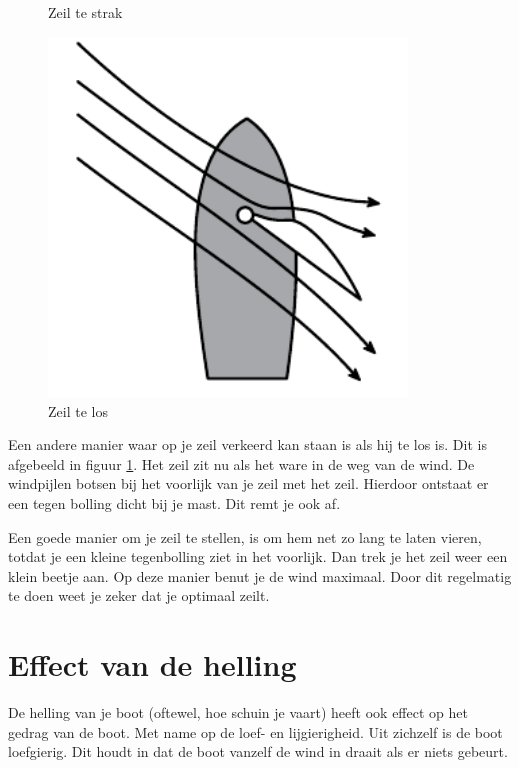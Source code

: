 \begin{figure}[H]
\begin{minipage}[b]{0.32\textwidth}
    \caption{Zeil te strak}
    \label{pic:zeil_strak}
    \end{minipage}
  \hfill
  \begin{minipage}[b]{0.32\textwidth}
    \centering
    \includegraphics[width=0.85\textwidth]{Hoofdstukken/Krachten/pdf/zeil_los.pdf}
    \caption{Zeil te los}
    \label{pic:zeil_los}
  \end{minipage}
\end{figure}
Een andere manier waar op je zeil verkeerd kan staan is als hij te los is. Dit is afgebeeld in figuur \ref{pic:zeil_los}. Het zeil zit nu als het ware in de weg van de wind. De windpijlen botsen bij het voorlijk van je zeil met het zeil. Hierdoor ontstaat er een tegen bolling dicht bij je mast. Dit remt je ook af. 

Een goede manier om je zeil te stellen, is om hem net zo lang te laten vieren, totdat je een kleine tegenbolling ziet in het voorlijk. Dan trek je het zeil weer een klein beetje aan. Op deze manier benut je de wind maximaal. Door dit regelmatig te doen weet je zeker dat je optimaal zeilt. 
\section{Effect van de helling}
De helling van je boot (oftewel, hoe schuin je vaart) heeft ook effect op het gedrag van de boot. Met name op de loef- en lijgierigheid. Uit zichzelf is de boot loefgierig. Dit houdt in dat de boot vanzelf de wind in draait als er niets gebeurt. 

